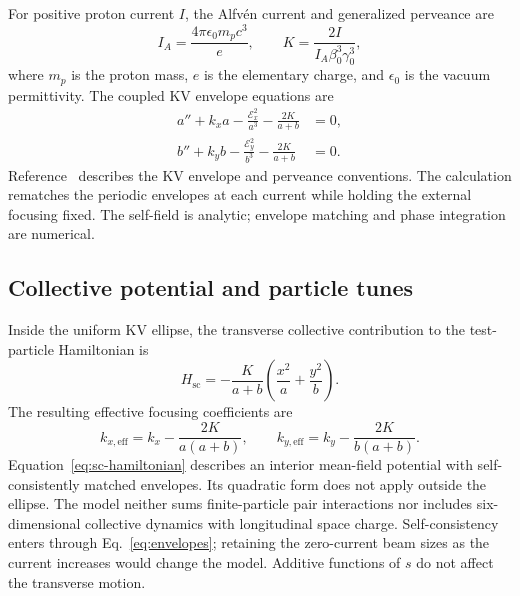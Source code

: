 \documentclass[11pt,a4paper]{article}
\numberwithin{equation}{section}
\begin{document}
For positive proton current $I$, the Alfv\'en current and generalized
perveance are
\begin{equation}
  I_A=\frac{4\pi\epsilon_0m_pc^3}{e},\qquad
  K=\frac{2I}{I_A\beta_0^3\gamma_0^3},
  \label{eq:perveance}
\end{equation}
where $m_p$ is the proton mass, $e$ is the elementary charge, and
$\epsilon_0$ is the vacuum permittivity. The coupled KV envelope
equations are
\begin{equation}
  \begin{aligned}
    a''+k_xa-\frac{\mathcal E_x^2}{a^3}-\frac{2K}{a+b}&=0,\\
    b''+k_yb-\frac{\mathcal E_y^2}{b^3}-\frac{2K}{a+b}&=0.
  \end{aligned}
  \label{eq:envelopes}
\end{equation}
Reference~\cite{prior} describes the KV envelope and perveance
conventions. The calculation rematches the periodic envelopes at each
current while holding the external focusing fixed. The self-field is
analytic; envelope matching and phase integration are numerical.

\subsection{Collective potential and particle tunes}

Inside the uniform KV ellipse, the transverse collective contribution to
the test-particle Hamiltonian is
\begin{equation}
  H_{\mathrm{sc}}
  =-\frac{K}{a+b}\left(\frac{x^2}{a}+\frac{y^2}{b}\right).
  \label{eq:sc-hamiltonian}
\end{equation}
The resulting effective focusing coefficients are
\begin{equation}
  k_{x,\mathrm{eff}}=k_x-\frac{2K}{a(a+b)},\qquad
  k_{y,\mathrm{eff}}=k_y-\frac{2K}{b(a+b)}.
  \label{eq:effective-focusing}
\end{equation}
Equation~\eqref{eq:sc-hamiltonian} describes an interior mean-field
potential with self-consistently matched envelopes. Its quadratic form
does not apply outside the ellipse. The model neither sums
finite-particle pair interactions nor includes six-dimensional collective
dynamics with longitudinal space charge. Self-consistency enters through
Eq.~\eqref{eq:envelopes}; retaining the zero-current beam sizes as the
current increases would change the model. Additive functions of $s$ do
not affect the transverse motion.
\end{document}
